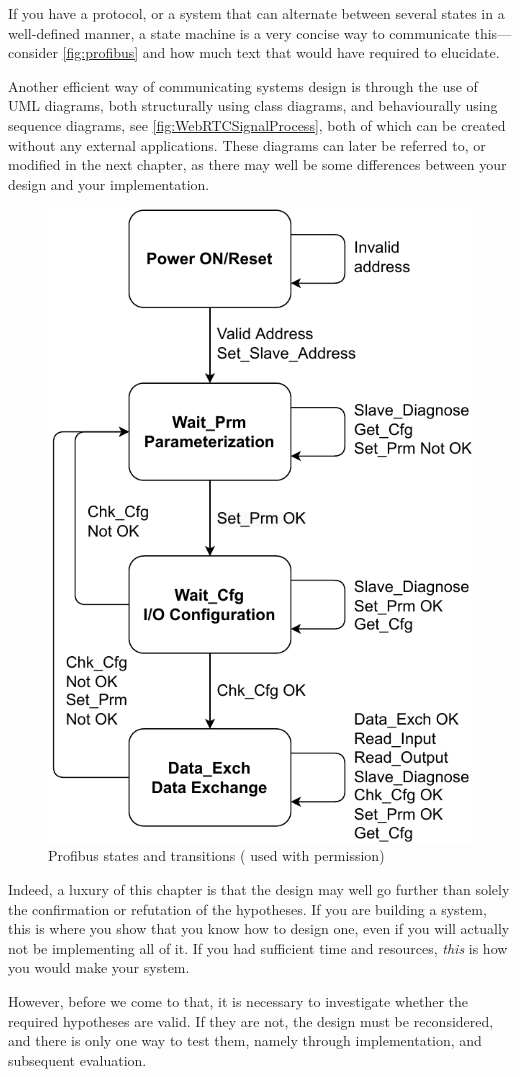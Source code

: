 If you have a protocol, or a system that can alternate between several
states in a well-defined manner, a state machine is a very concise way to
communicate this---consider \autoref{fig:profibus} and how much text that
would have required to elucidate.

Another efficient way of communicating systems design is through the use of
\ac{UML} diagrams, both structurally using class diagrams, and behaviourally
using sequence diagrams, see \autoref{fig:WebRTCSignalProcess}, both of
which can be created without any external applications.  These diagrams can
later be referred to, or modified in the next chapter, as there may well be
some differences between your design and your implementation.

\begin{figure}
  \centering
  \includegraphics[width=.5\linewidth]{gfx/state_machine_profibus.pdf}
  \caption{Profibus states and transitions (\cite{Overgaard2022:2022} used with permission)}
  \label{fig:profibus}
\end{figure}

Indeed, a luxury of this chapter is that the design may well go further than
solely the confirmation or refutation of the hypotheses.  If you are
building a system, this is where you show that you know how to design one,
even if you will actually not be implementing all of it.  If you had
sufficient time and resources, \emph{this} is how you would make your
system.

However, before we come to that, it is necessary to investigate whether the
required hypotheses are valid. If they are not, the design must be
reconsidered, and there is only one way to test them, namely through
implementation, and subsequent evaluation.


